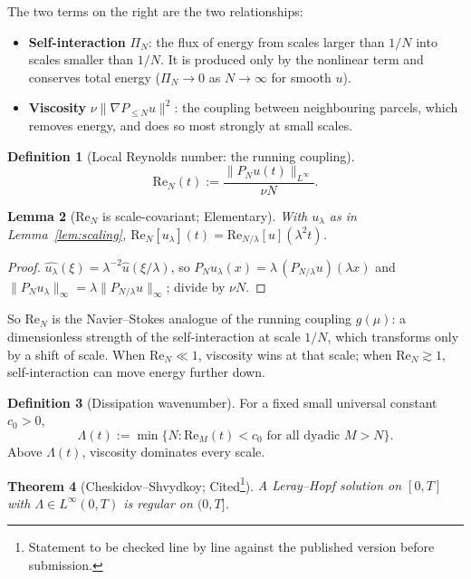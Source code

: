 \documentclass[11pt]{article}
\newtheorem{theorem}{Theorem}[section]
\newtheorem{lemma}[theorem]{Lemma}
\theoremstyle{definition}
\newtheorem{definition}[theorem]{Definition}
\theoremstyle{remark}
\renewcommand{\Re}{\mathrm{Re}}
\begin{document}
The two terms on the right are the two relationships:
\begin{itemize}
\item \textbf{Self-interaction} $\Pi_N$: the flux of energy from scales
larger than $1/N$ into scales smaller than $1/N$. It is produced only by
the nonlinear term and conserves total energy
($\Pi_N\to0$ as $N\to\infty$ for smooth $u$).
\item \textbf{Viscosity} $\nu\|\nabla P_{\le N}u\|^2$: the coupling between
neighbouring parcels, which removes energy, and does so most strongly at
small scales.
\end{itemize}

\begin{definition}[Local Reynolds number: the running coupling]
\[
\Re_N(t) := \frac{\|P_N u(t)\|_{L^\infty}}{\nu N}.
\]
\end{definition}

\begin{lemma}[$\Re_N$ is scale-covariant; Elementary]
With $u_\lambda$ as in Lemma~\ref{lem:scaling},
$\Re_N[u_\lambda](t)=\Re_{N/\lambda}[u](\lambda^2t)$.
\end{lemma}
\begin{proof}
$\widehat{u_\lambda}(\xi)=\lambda^{-2}\hat u(\xi/\lambda)$, so
$P_N u_\lambda(x)=\lambda\,(P_{N/\lambda}u)(\lambda x)$ and
$\|P_Nu_\lambda\|_\infty=\lambda\|P_{N/\lambda}u\|_\infty$; divide by $\nu N$.
\end{proof}

So $\Re_N$ is the Navier--Stokes analogue of the running coupling $g(\mu)$:
a dimensionless strength of the self-interaction at scale $1/N$, which
transforms only by a shift of scale. When $\Re_N\ll1$, viscosity wins at
that scale; when $\Re_N\gtrsim1$, self-interaction can move energy further
down.

\begin{definition}[Dissipation wavenumber]
For a fixed small universal constant $c_0>0$,
\[
\Lambda(t) := \min\{N : \Re_{M}(t) < c_0 \text{ for all dyadic } M > N\}.
\]
Above $\Lambda(t)$, viscosity dominates every scale.
\end{definition}

\begin{theorem}[Cheskidov--Shvydkoy; Cited\protect\footnote{Statement to be
checked line by line against the published version before submission.}]
\label{thm:cs}
A Leray--Hopf solution on $[0,T]$ with $\Lambda\in L^\infty(0,T)$ is regular
on $(0,T]$.
\end{theorem}
\end{document}
